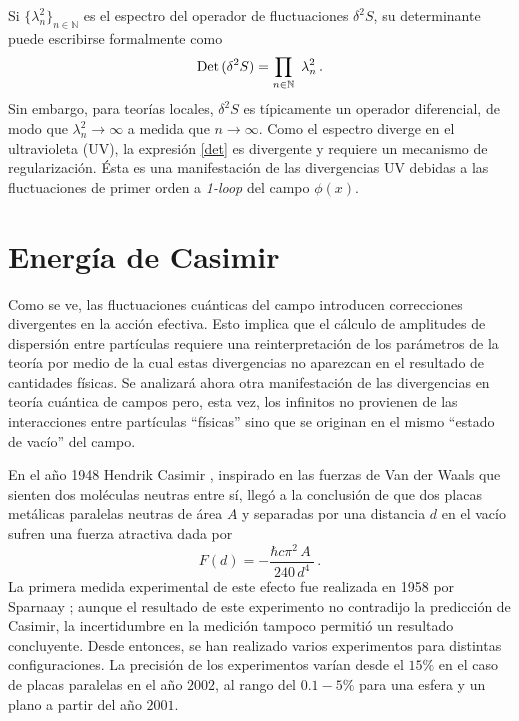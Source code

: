 Si $ \{ \lambda ^2 _n \} _{n \in \mathbb N}$ es el espectro del operador de fluctuaciones $ \delta ^2 S $, su determinante puede escribirse formalmente como
\begin{equation}\label{det}
{\rm Det}\,(\delta ^2 S) = \prod_{ n \in \mathbb N }\ \lambda ^2 _n\,.
\end{equation}
Sin embargo, para teorías locales, $\delta ^2 S$ es típicamente un operador diferencial, de modo que $\lambda ^2 _n\to\infty$ a medida que $n\to \infty$. Como el espectro diverge en el ultravioleta (UV), la expresión \eqref{det} es divergente y requiere un mecanismo de regularización. Ésta es una manifestación de las divergencias UV debidas a las fluctuaciones de primer orden a {\it 1-loop} del campo $\phi (x)$.


\section{Energía de Casimir}\label{sec.casimir}

Como se ve, las fluctuaciones cuánticas del campo introducen correcciones divergentes en la acción efectiva. Esto implica que el cálculo de amplitudes de dispersión entre partículas requiere una reinterpretación de los parámetros de la teoría por medio de la cual estas divergencias no aparezcan en el resultado de cantidades físicas. Se analizará ahora otra manifestación de las divergencias en teoría cuántica de campos pero, esta vez, los infinitos no provienen de las interacciones entre partículas ``físicas'' sino que se originan en el mismo ``estado de vacío'' del campo.


En el año 1948 Hendrik Casimir \cite{Casimir:1948dh}, inspirado en las fuerzas de Van der Waals que sienten dos moléculas neutras entre sí, llegó a la conclusión de que dos placas metálicas paralelas neutras de área $A$ y separadas por una distancia $d$ en el vacío sufren una fuerza atractiva dada por
\begin{equation}
		F(d) = -  \frac{\hbar c \pi ^2 \,A\  }{240 \, d^4}\,.
	\label{casimir.1}
\end{equation}
La primera medida experimental de este efecto fue realizada en 1958 por Sparnaay \cite{SPARNAAY1958751}; aunque el resultado de este experimento no contradijo la predicción de Casimir, la incertidumbre en la medición tampoco permitió un resultado concluyente. Desde entonces, se han realizado varios experimentos para distintas configuraciones. La precisión de los experimentos varían desde el $15 \%$ en el caso de placas paralelas \cite{casimir.placas.paralelas,articulo.casimir} en el año $2002$, al rango del $0.1-5 \%$ para una esfera y un plano a partir del año $2001$\cite{casimir.cilindro1,PhysRevLett.81.4549,PhysRevD.60.111101,PhysRevA.62.052109}.

